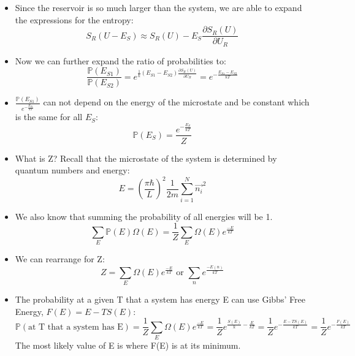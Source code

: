 \documentclass[12pt, letterpaper, twoside]{article}
\begin{document}
\begin{itemize}
    \item Since the reservoir is so much larger than the system, we are able to expand the expressions for the entropy:
    \begin{equation*}
        S_R(U-E_S) \approx S_R(U) - E_S\frac{\partial S_R(U)}{\partial U_R}
    \end{equation*}
    \item Now we can further expand the ratio of probabilities to:
    \begin{equation*}
        \frac{\mathbb{P}(E_{S1})}{\mathbb{P}(E_{S2})} = e^{\frac{1}{k}(E_{S1} - E_{S2})\frac{\partial S_R(U)}{\partial U_R}} = e^{-\frac{E_{S1}-E_{S2}}{kT}}
    \end{equation*}
    \item $\frac{\mathbb{P}(E_{S1})}{e^{-\frac{E_{S1}}{kT}}}$ can not depend on the energy of the microstate and be constant which is the same for all $E_S$:
    \begin{equation*}
        \mathbb{P}(E_S) = \frac{e^{-\frac{E_S}{kT}}}{Z}
    \end{equation*}
    \item What is Z? Recall that the microstate of the system is determined by quantum numbers and energy:
    \begin{equation*}
        E = (\frac{\pi\hbar}{L})^2\frac{1}{2m}\sum_{i=1}^N\vec{n_i}^2
    \end{equation*}
    \item We also know that summing the probability of all energies will be 1.
    \begin{equation*}
        \sum_E\mathbb{P}(E)\Omega(E) = \frac{1}{Z}\sum_E\Omega(E)e^{\frac{-E}{kT}}
    \end{equation*}
    \item We can rearrange for Z:
    \begin{equation*}
        Z = \sum_E\Omega(E)e^{\frac{-E}{kT}} \text{ or } \sum_n e^{\frac{-E(n)}{kT}}
    \end{equation*}
    \item The probability at a given T that a system has energy E can use Gibbs' Free Energy, $F(E) = E - TS(E)$:
    \begin{equation*}
        \mathbb{P}(\text{at T that a system has E}) = \frac{1}{Z}\sum_E\Omega(E)e^{\frac{-E}{kT}} = \frac{1}{Z}e^{\frac{S(E)}{k}-\frac{E}{kT}} = \frac{1}{Z}e^{-\frac{E - TS(E)}{kT}} = \frac{1}{Z}e^{-\frac{F(E)}{kT}}
    \end{equation*}
    The most likely value of E is where F(E) is at its minimum.
\end{itemize}
\end{document}
